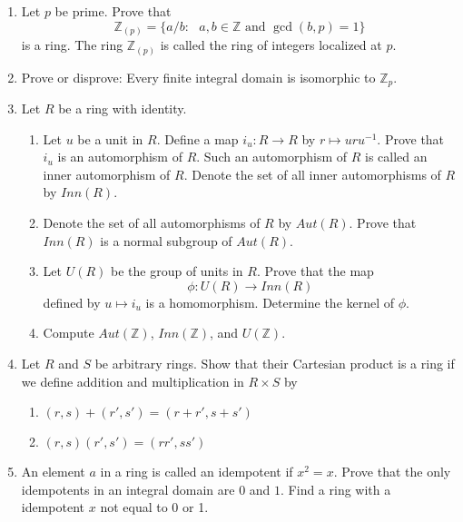 {\begin{enumerate}
 
\item
Let $p$ be prime. Prove that
\[
{\mathbb Z}_{(p)}\label{notelocalint} = \{ a / b :  \mbox{ $a, b \in
{\mathbb Z}$ and $\gcd( b,p) =  1$}  \}  
\]
is a ring.  The ring ${\mathbb Z}_{(p)}$ is called the {\bfi ring of
integers localized at $p$}.  
 
 
\item
Prove or disprove: Every finite integral domain is isomorphic to
${\mathbb Z}_p$. 
 
 
\item
Let $R$ be a ring with identity.
\begin{enumerate}

 
 \item
Let $u$ be a unit in $R$.  Define a map $i_u : R \rightarrow R$ by $r
\mapsto uru^{-1}$. Prove that $i_u$ is an automorphism of $R$. Such an
automorphism of $R$ is called an inner automorphism of $R$. Denote the
set of all inner automorphisms of $R$ by $Inn(R)$.
 
 \item
Denote the set of all automorphisms of $R$ by $Aut(R)$. Prove that
$Inn(R)$ is a normal subgroup of  $Aut(R)$. 
 
 \item
Let $U(R)$ be the group of units in $R$. Prove that the map
\[
\phi : U(R) \rightarrow Inn(R)
\]
defined by $u \mapsto i_u$ is a homomorphism.  Determine the kernel of
$\phi$. 
 
 \item
Compute $Aut( {\mathbb Z})$, $Inn( {\mathbb Z})$,  and $U( {\mathbb Z})$. 
 
\end{enumerate}
 
 
\item
Let $R$ and $S$ be arbitrary rings.  Show that their Cartesian product
is a ring if we define addition and multiplication in $R \times S$  by 
\begin{enumerate}
 
 \item
$(r, s) + (r', s') = ( r + r', s + s')$
 
 \item
$(r, s)(r', s') = ( rr', ss')$
 
\end{enumerate}
 
 
\item
An element $a$ in a ring is called an {\bfi
idempotent\/} if $x^2 = x$.
Prove that the only idempotents in an integral domain are $0$ and $1$. 
Find a ring with a idempotent $x$ not equal to 0 or 1.
 

\end{enumerate}}
